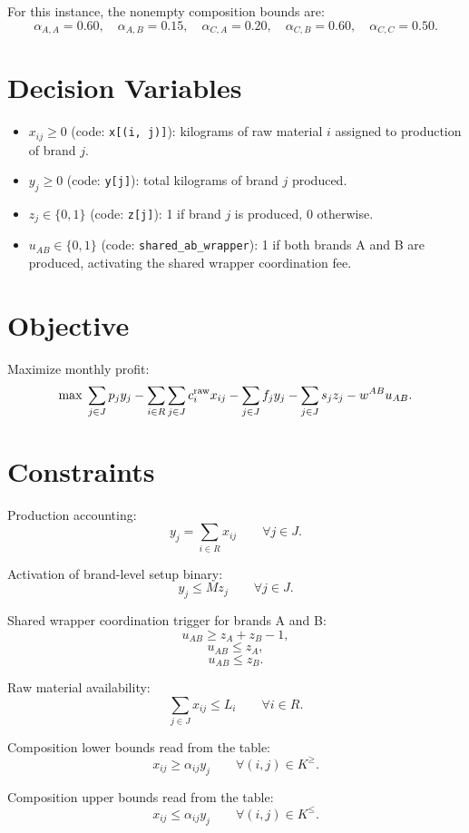 For this instance, the nonempty composition bounds are:
\[
\alpha_{A,A}=0.60,\quad \alpha_{A,B}=0.15,\quad
\alpha_{C,A}=0.20,\quad \alpha_{C,B}=0.60,\quad \alpha_{C,C}=0.50.
\]

\section*{Decision Variables}

\begin{itemize}
    \item $x_{ij} \ge 0$ (code: \texttt{x[(i, j)]}): kilograms of raw material $i$ assigned to production of brand $j$.
    \item $y_j \ge 0$ (code: \texttt{y[j]}): total kilograms of brand $j$ produced.
    \item $z_j \in \{0,1\}$ (code: \texttt{z[j]}): 1 if brand $j$ is produced, 0 otherwise.
    \item $u_{AB} \in \{0,1\}$ (code: \texttt{shared\_ab\_wrapper}): 1 if both brands A and B are produced, activating the shared wrapper coordination fee.
\end{itemize}

\section*{Objective}

Maximize monthly profit:
\[
\max \;
\sum_{j\in J} p_j y_j
-\sum_{i\in R}\sum_{j\in J} c_i^{\rm raw} x_{ij}
-\sum_{j\in J} f_j y_j
-\sum_{j\in J} s_j z_j
-w^{AB} u_{AB}.
\]

\section*{Constraints}

Production accounting:
\[
y_j=\sum_{i\in R} x_{ij}
\qquad \forall j\in J.
\]

Activation of brand-level setup binary:
\[
y_j \le M z_j
\qquad \forall j\in J.
\]

Shared wrapper coordination trigger for brands A and B:
\[
u_{AB} \ge z_A+z_B-1,
\]
\[
u_{AB} \le z_A,
\]
\[
u_{AB} \le z_B.
\]

Raw material availability:
\[
\sum_{j\in J} x_{ij} \le L_i
\qquad \forall i\in R.
\]

Composition lower bounds read from the table:
\[
x_{ij} \ge \alpha_{ij} y_j
\qquad \forall (i,j)\in K^{\ge}.
\]

Composition upper bounds read from the table:
\[
x_{ij} \le \alpha_{ij} y_j
\qquad \forall (i,j)\in K^{\le}.
\]


